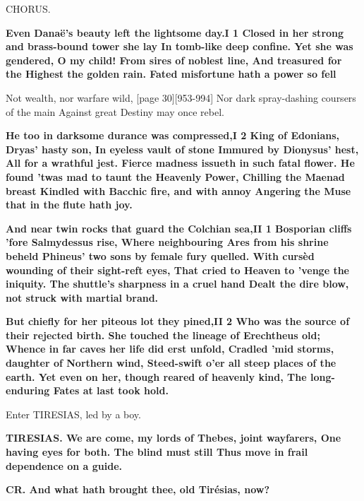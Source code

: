 \documentclass[11pt,letter]{book}
\begin{document}
\par  CHORUS.

\par \textbf{Even Danaë’s beauty left the lightsome day.I 1 Closed in her strong and brass-bound tower she lay In tomb-like deep confine. Yet she was gendered, O my child! From sires of noblest line, And treasured for the Highest the golden rain. Fated misfortune hath a power so fell}
\par   Not wealth, nor warfare wild, [page 30][953-994] Nor dark spray-dashing coursers of the main Against great Destiny may once rebel.

\par \textbf{He too in darksome durance was compressed,I 2 King of Edonians, Dryas’ hasty son, In eyeless vault of stone Immured by Dionysus’ hest, All for a wrathful jest. Fierce madness issueth in such fatal flower. He found ’twas mad to taunt the Heavenly Power, Chilling the Maenad breast Kindled with Bacchic fire, and with annoy Angering the Muse that in the flute hath joy.}
\par 

\par \textbf{And near twin rocks that guard the Colchian sea,II 1 Bosporian cliffs ’fore Salmydessus rise, Where neighbouring Ares from his shrine beheld Phineus’ two sons by female fury quelled. With cursèd wounding of their sight-reft eyes, That cried to Heaven to ’venge the iniquity. The shuttle’s sharpness in a cruel hand Dealt the dire blow, not struck with martial brand.}
\par 

\par \textbf{But chiefly for her piteous lot they pined,II 2 Who was the source of their rejected birth. She touched the lineage of Erechtheus old; Whence in far caves her life did erst unfold, Cradled ’mid storms, daughter of Northern wind, Steed-swift o’er all steep places of the earth. Yet even on her, though reared of heavenly kind, The long-enduring Fates at last took hold.}
\par 

\par  Enter TIRESIAS, led by a boy.

\par \textbf{TIRESIAS. We are come, my lords of Thebes, joint wayfarers, One having eyes for both. The blind must still Thus move in frail dependence on a guide.}
\par 

\par \textbf{CR. And what hath brought thee, old Tirésias, now?}
\par 
\end{document}
